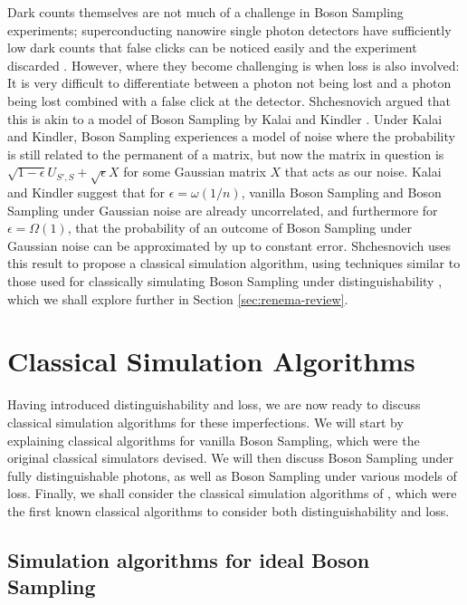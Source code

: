 Dark counts themselves are not much of a challenge in Boson Sampling experiments; superconducting nanowire single photon detectors have sufficiently low dark counts that false clicks can be noticed easily and the experiment discarded \cite{kitaygorsky2005}. However, where they become challenging is when loss is also involved: It is very difficult to differentiate between a photon not being lost and a photon being lost combined with a false click at the detector. Shchesnovich \cite{shchesnovich2019} argued that this is akin to a model of Boson Sampling by Kalai and Kindler \cite{kalai2014}. Under Kalai and Kindler, Boson Sampling experiences a model of noise where the probability is still related to the permanent of a matrix, but now  the matrix in question is $\sqrt{1-\epsilon}U_{S',S}+\sqrt{\epsilon}X$ for some Gaussian matrix $X$ that acts as our noise. Kalai and Kindler suggest that for $\epsilon=\omega(1/n)$, vanilla Boson Sampling and Boson Sampling under Gaussian noise are already uncorrelated, and furthermore for $\epsilon = \Omega(1)$, that the probability of an outcome of Boson Sampling under Gaussian noise can be approximated by up to constant error. Shchesnovich \cite{shchesnovich2019} uses this result to propose a classical simulation algorithm, using techniques similar to those used for classically simulating Boson Sampling under distinguishability \cite{renema2018, renema2018loss}, which we shall explore further in Section \ref{sec:renema-review}.

\section{Classical Simulation Algorithms}
\label{sec:classical-simulations}

Having introduced distinguishability and loss, we are now ready to discuss classical simulation algorithms for these imperfections. We will start by explaining classical algorithms for vanilla Boson Sampling, which were the original classical simulators devised. We will then discuss Boson Sampling under fully distinguishable photons, as well as Boson Sampling under various models of loss. Finally, we shall consider the classical simulation algorithms of \cite{renema2018, renema2018loss}, which were the first known classical algorithms to consider both distinguishability and loss.

\subsection{Simulation algorithms for ideal Boson Sampling}

